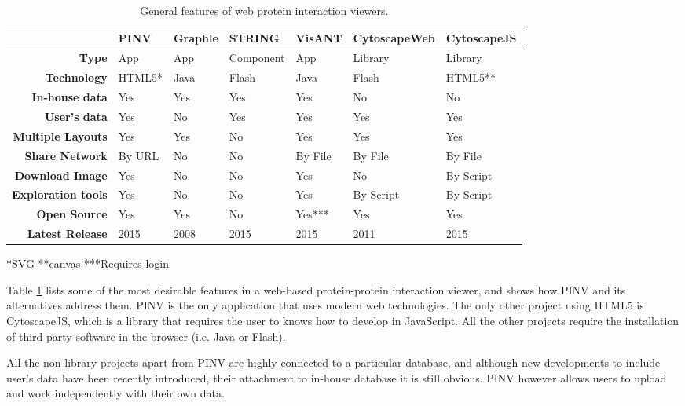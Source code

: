 \begin{table}[!ht]
\centering
        \caption{General features of web protein interaction viewers.}
        \begin{tabular}{ r | l | l | l | l | l | l }
 \rowcolor{table_header}
 & \textbf{PINV} & \textbf{Graphle} & \textbf{STRING} & \textbf{VisANT} & \textbf{CytoscapeWeb} & \textbf{CytoscapeJS}\\
\hline \rowcolor{row_odd}
\textbf{Type} & App & App & Component & App & Library & Library\\
\rowcolor{row_even}
\textbf{Technology} & HTML5* & Java & Flash & Java & Flash & HTML5**\\
\rowcolor{row_odd}
\textbf{In-house data} & Yes & Yes & Yes & Yes & No & No\\
\rowcolor{row_even}
\textbf{User's data} & Yes & No & Yes & Yes & Yes & Yes\\
\rowcolor{row_odd}
\textbf{Multiple Layouts} & Yes & Yes & No & Yes & Yes & Yes\\
\rowcolor{row_even}
\textbf{Share Network} & By URL & No & No & By File & By File & By File\\
\rowcolor{row_odd}
\textbf{Download Image} & Yes & No & No & Yes & No & By Script\\
\rowcolor{row_even}
\textbf{Exploration tools} & Yes & No & No & Yes & By Script & By Script\\
\rowcolor{row_odd}
\textbf{Open Source} & Yes & Yes & No & Yes*** & Yes & Yes\\
\rowcolor{row_even}
\textbf{Latest Release} & 2015 & 2008 & 2015 & 2015 & 2011 & 2015\\ 
        \end{tabular}
        \label{tab:int_viewers}
        \small{*SVG **canvas ***Requires login}
\end{table}

Table \ref{tab:int_viewers} lists some of the most desirable features in a web-based protein-protein interaction viewer, and shows how PINV and its alternatives address them. PINV is the only application that uses modern web technologies. The only other project using HTML5 is CytoscapeJS, which is a library that requires the user to knows how to develop in JavaScript. All the other projects require the installation of third party software in the browser (i.e. Java or Flash).

All the non-library projects apart from PINV are highly connected to a particular database, and although new developments to include user's data have been recently introduced, their attachment to in-house database it is still obvious. PINV however allows users to upload and work independently with their own data.

